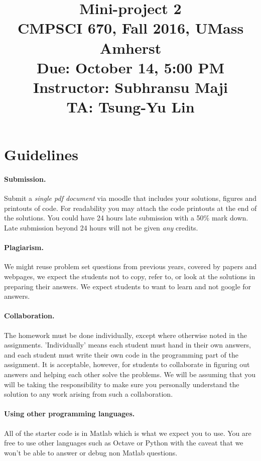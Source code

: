 \documentclass[10pt,letterpaper]{article}
\title{
  \textbf{Mini-project 2} \\
  \Large{CMPSCI 670, Fall 2016, UMass Amherst} \\
  \Large{Due:  October 14, 5:00 PM } \\
  \Large{Instructor: Subhransu Maji} \\
  \Large{TA: Tsung-Yu Lin}
}
\date{}
\begin{document}
\maketitle

\renewcommand\thesubsection{\thesection.\alph{subsection}}


\section*{Guidelines}

\paragraph{Submission.} Submit a \emph{single pdf document} via moodle that includes your solutions, figures and printouts of code. For readability you may attach the code printouts at the end of the solutions. You could have 24 hours late submission with a 50\% mark down. Late submission beyond 24 hours will not be given \emph{any} credits. 

\paragraph{Plagiarism.} We might reuse problem set questions from previous years, covered by papers and webpages, we expect the students not to copy, refer to, or look at the solutions in preparing their answers. We expect students to want to learn and not google for answers. 

\paragraph{Collaboration.} The homework must be done individually, except where otherwise noted in the assignments. 'Individually' means each student must hand in their own answers, and each student must write their own code in the programming part of the assignment. It is acceptable, however, for students to collaborate in figuring out answers and helping each other solve the problems. We will be assuming that you will be taking the responsibility to make sure you personally understand the solution to any work arising from such a collaboration.

\paragraph{Using other programming languages.} All of the starter code is in Matlab which is what we expect you to use. You are free to use other languages such as Octave or Python with the caveat that we won't be able to answer or debug non Matlab questions.
\end{document}
